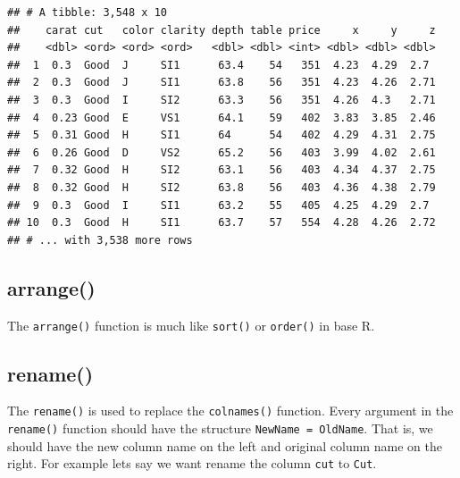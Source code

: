 \documentclass[
]{book}
\newenvironment{Shaded}{\begin{snugshade}}{\end{snugshade}}
\newcommand{\DataTypeTok}[1]{\textcolor[rgb]{0.13,0.29,0.53}{#1}}
\newcommand{\KeywordTok}[1]{\textcolor[rgb]{0.13,0.29,0.53}{\textbf{#1}}}
\newcommand{\NormalTok}[1]{#1}
\newcommand{\OperatorTok}[1]{\textcolor[rgb]{0.81,0.36,0.00}{\textbf{#1}}}
\newcommand{\StringTok}[1]{\textcolor[rgb]{0.31,0.60,0.02}{#1}}
\begin{document}
\begin{verbatim}
## # A tibble: 3,548 x 10
##    carat cut   color clarity depth table price     x     y     z
##    <dbl> <ord> <ord> <ord>   <dbl> <dbl> <int> <dbl> <dbl> <dbl>
##  1  0.3  Good  J     SI1      63.4    54   351  4.23  4.29  2.7 
##  2  0.3  Good  J     SI1      63.8    56   351  4.23  4.26  2.71
##  3  0.3  Good  I     SI2      63.3    56   351  4.26  4.3   2.71
##  4  0.23 Good  E     VS1      64.1    59   402  3.83  3.85  2.46
##  5  0.31 Good  H     SI1      64      54   402  4.29  4.31  2.75
##  6  0.26 Good  D     VS2      65.2    56   403  3.99  4.02  2.61
##  7  0.32 Good  H     SI2      63.1    56   403  4.34  4.37  2.75
##  8  0.32 Good  H     SI2      63.8    56   403  4.36  4.38  2.79
##  9  0.3  Good  I     SI1      63.2    55   405  4.25  4.29  2.7 
## 10  0.3  Good  H     SI1      63.7    57   554  4.28  4.26  2.72
## # ... with 3,538 more rows
\end{verbatim}

\hypertarget{arrange}{%
\subsection{arrange()}\label{arrange}}

The \texttt{arrange()} function is much like \texttt{sort()} or \texttt{order()} in base R.

\hypertarget{rename}{%
\subsection{rename()}\label{rename}}

The \texttt{rename()} is used to replace the \texttt{colnames()} function. Every argument in the \texttt{rename()} function should have the structure \texttt{NewName\ =\ OldName}. That is, we should have the new column name on the left and original column name on the right. For example lets say we want rename the column \texttt{cut} to \texttt{Cut}.

\begin{Shaded}
\end{Shaded}
\end{document}
